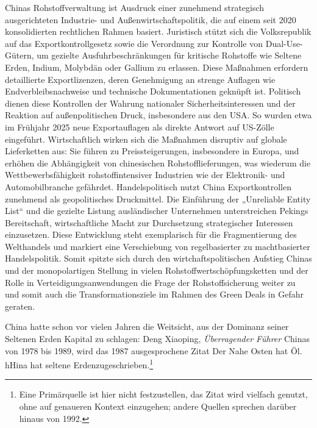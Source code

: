 \documentclass[12pt,a4paper,oneside]{book} %
\begin{document}
Chinas Rohstoffverwaltung ist Ausdruck einer zunehmend strategisch ausgerichteten Industrie- und Außenwirtschaftspolitik, die auf einem seit 2020 konsolidierten rechtlichen Rahmen basiert. Juristisch stützt sich die Volksrepublik auf das Exportkontrollgesetz sowie die Verordnung zur Kontrolle von Dual-Use-Gütern, um gezielte Ausfuhrbeschränkungen für kritische Rohstoffe wie Seltene Erden, Indium, Molybdän oder Gallium zu erlassen. Diese Maßnahmen erfordern detaillierte Exportlizenzen, deren Genehmigung an strenge Auflagen wie Endverbleibsnachweise und technische Dokumentationen geknüpft ist. Politisch dienen diese Kontrollen der Wahrung nationaler Sicherheitsinteressen und der Reaktion auf außenpolitischen Druck, insbesondere aus den USA. So wurden etwa im Frühjahr 2025 neue Exportauflagen als direkte Antwort auf US-Zölle eingeführt. Wirtschaftlich wirken sich die Maßnahmen disruptiv auf globale Lieferketten aus: Sie führen zu Preissteigerungen, insbesondere in Europa, und erhöhen die Abhängigkeit von chinesischen Rohstofflieferungen, was wiederum die Wettbewerbsfähigkeit rohstoffintensiver Industrien wie der Elektronik- und Automobilbranche gefährdet. Handelspolitisch nutzt China Exportkontrollen zunehmend als geopolitisches Druckmittel. Die Einführung der „Unreliable Entity List“ und die gezielte Listung ausländischer Unternehmen unterstreichen Pekings Bereitschaft, wirtschaftliche Macht zur Durchsetzung strategischer Interessen einzusetzen. Diese Entwicklung steht exemplarisch für die Fragmentierung des Welthandels und markiert eine Verschiebung von regelbasierter zu machtbasierter Handelspolitik. Somit spitzte sich durch den wirtchaftspolitischen Aufstieg Chinas und der monopolartigen Stellung in vielen Rohstoffwertschöpfungsketten und der Rolle in Verteidigungsanwendungen die Frage der Rohstoffsicherung weiter zu und somit auch die Transformationsziele im Rahmen des Green Deals in Gefahr geraten.\autocite{Frenz 2025, S. 1079-1080}

China hatte schon vor vielen Jahren die Weitsicht,\autocite[Siehe insbesondere zum Hintergrund des Aufbaus der chinesischen Seltenerdmetallwirtschaft]{https://www.nytimes.com/2025/07/05/business/china-rare-earth-history.html} aus der Dominanz seiner Seltenen Erden Kapital zu schlagen: Deng Xiaoping, \textit{Überragender Führer} Chinas von 1978 bis 1989, wird das 1987 ausgesprochene Zitat \glqq Der Nahe Osten hat Öl. hHina hat seltene Erden\grqq zugeschrieben.\footnote{Eine Primärquelle ist hier nicht festzustellen, das Zitat wird vielfach genutzt, ohne auf genaueren Kontext einzugehen; andere Quellen sprechen darüber hinaus von 1992.}
\end{document}
